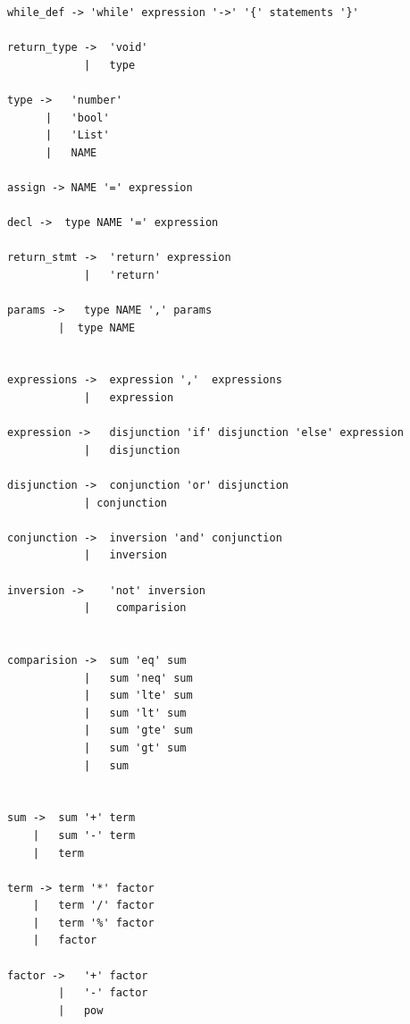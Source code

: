 \begin{verbatim}
while_def -> 'while' expression '->' '{' statements '}'              

return_type ->  'void'                        
            |   type                          

type ->   'number'        
      |   'bool'          
      |   'List'          
      |   NAME            

assign -> NAME '=' expression                         

decl ->  type NAME '=' expression                              

return_stmt ->  'return' expression                                      
            |   'return'                                        

params ->   type NAME ',' params      
        |  type NAME                  


expressions ->  expression ','  expressions               
            |   expression                                

expression ->   disjunction 'if' disjunction 'else' expression            
            |   disjunction                                                

disjunction ->  conjunction 'or' disjunction                                
            | conjunction                                                   

conjunction ->  inversion 'and' conjunction                                 
            |   inversion                                                   

inversion ->    'not' inversion                                             
            |    comparision                                                


comparision ->  sum 'eq' sum                       
            |   sum 'neq' sum                      
            |   sum 'lte' sum                      
            |   sum 'lt' sum                       
            |   sum 'gte' sum                      
            |   sum 'gt' sum                       
            |   sum


sum ->  sum '+' term                            
    |   sum '-' term                            
    |   term 

term -> term '*' factor                         
    |   term '/' factor                         
    |   term '%' factor                         
    |   factor

factor ->   '+' factor
        |   '-' factor
        |   pow


\end{verbatim}
